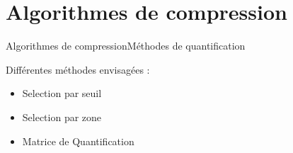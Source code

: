 \section{Algorithmes de compression}
\begin{frame}{Algorithmes de compression}{Méthodes de quantification}
    \begin{block}{Différentes méthodes envisagées :}
        \begin{itemize}
            \item <2-> Selection par seuil
            \item <3-> Selection par zone
            \item <4-> Matrice de Quantification
        \end{itemize}
    \end{block} 
\end{frame}

